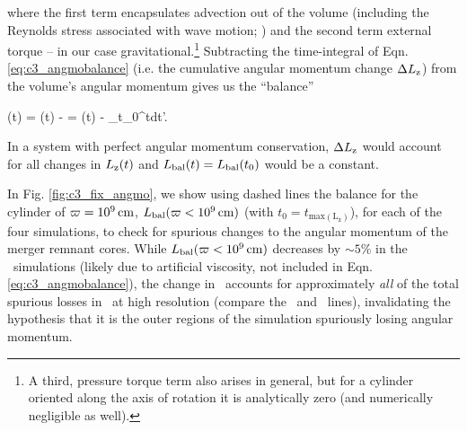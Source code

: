 

\noindent where the first term encapsulates advection out of the volume (including the Reynolds stress associated with wave motion; \citealt{balb03, kratl16}) and the second term external torque -- in our case gravitational.\footnote{A third, pressure torque term also arises in general, but for a cylinder oriented along the axis of rotation it is analytically zero (and numerically negligible as well).}  Subtracting the time-integral of Eqn. \ref{eq:c3_angmobalance} (i.e. the cumulative angular momentum change $\Delta \Lz$) from the volume's angular momentum gives us the ``balance''

\eqbegin
\Lbal(t) = \Lz(t) - \Delta \Lz = \Lz(t) - \int_{t_0}^{t}dt'.
\label{eq:c3_angmobalance2}
\eqend

\noindent In a system with perfect angular momentum conservation, $\Delta \Lz$ would account for all changes in $\Lz(t)$ and $\Lbal(t) = \Lbal(t_0)$ would be a constant.  

In Fig. \ref{fig:c3_fix_angmo}, we show using dashed lines the balance for the cylinder of $\varpi = 10^9\,\mathrm{cm}$, $\Lbal(\winnercyl)$ {\charles (with $t_0 = t_\mathrm{max(L_z)}$)}, for each of the four simulations, to check for spurious changes to the angular momentum of the merger remnant cores.  While $\Lbal(\winnercyl)$ decreases by $\sim5$\% in the \gasoline\ simulations (likely due to artificial viscosity, not included in Eqn. \ref{eq:c3_angmobalance}), the change in \Lbal\ accounts for approximately \textit{all} of the total spurious losses in \arepo\ at high resolution (compare the \Lztot\ and \Lbal\ lines), invalidating the hypothesis that it is the outer regions of the simulation spuriously losing angular momentum.  


